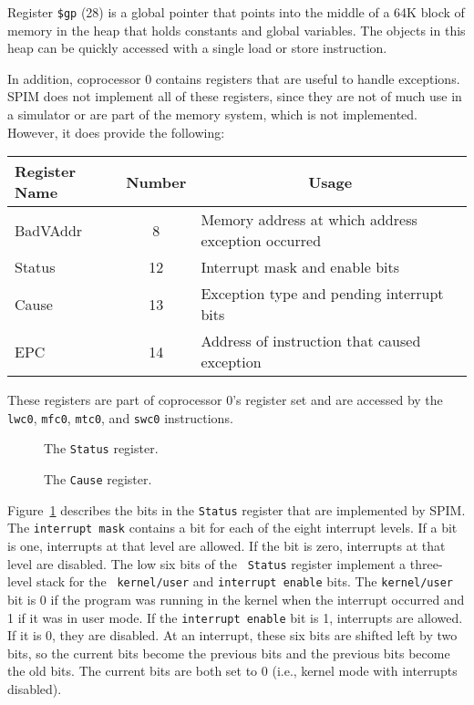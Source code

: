 \documentclass[11pt]{article}
\begin{document}
Register {\tt \$gp} (28) is a global pointer that points into the
middle of a 64K block of memory in the heap that holds constants and
global variables.  The objects in this heap can be quickly accessed
with a single load or store instruction.

In addition, coprocessor 0 contains registers that are useful to
handle exceptions.  SPIM does not implement all of these registers,
since they are not of much use in a simulator or are part of the
memory system, which is not implemented.  However, it does provide the
following:
\begin{center}
  \small
  \begin{tabular}{|l|c|l|}
    \hline
    {\bf Register Name} & {\bf Number} & \multicolumn{1}{|c|}{\bf Usage} \\
    \hline
    \hline
    BadVAddr & 8 & Memory address at which address exception occurred \\
    Status & 12 & Interrupt mask and enable bits \\
    Cause & 13 & Exception type and pending interrupt bits \\
    EPC & 14 & Address of instruction that caused exception \\
    \hline
  \end{tabular}
\end{center}
These registers are part of coprocessor 0's register set and are
accessed by the {\tt lwc0}, {\tt mfc0}, {\tt mtc0}, and {\tt swc0}
instructions.

\begin{figure}
  \centerline{}
  \caption{The {\tt Status} register.}
  \label{fig:status_reg}
\end{figure}
\begin{figure}
  \centerline{}
  \caption{The {\tt Cause} register.}
  \label{fig:cause_reg}
\end{figure}
Figure~\ref{fig:status_reg} describes the bits in the {\tt Status}
register that are implemented by SPIM.  The {\tt interrupt mask}
contains a bit for each of the eight interrupt levels.  If a bit is
one, interrupts at that level are allowed.  If the bit is zero,
interrupts at that level are disabled.  The low six bits of the {\tt
Status} register implement a three-level stack for the {\tt
kernel/user} and {\tt interrupt enable} bits.  The {\tt kernel/user}
bit is 0 if the program was running in the kernel when the interrupt
occurred and 1 if it was in user mode. If the {\tt interrupt enable}
bit is 1, interrupts are allowed.  If it is 0, they are disabled. At an
interrupt, these six bits are shifted left by two bits, so the current
bits become the previous bits and the previous bits become the old
bits.  The current bits are both set to 0 (i.e., kernel mode with
interrupts disabled).
\end{document}

